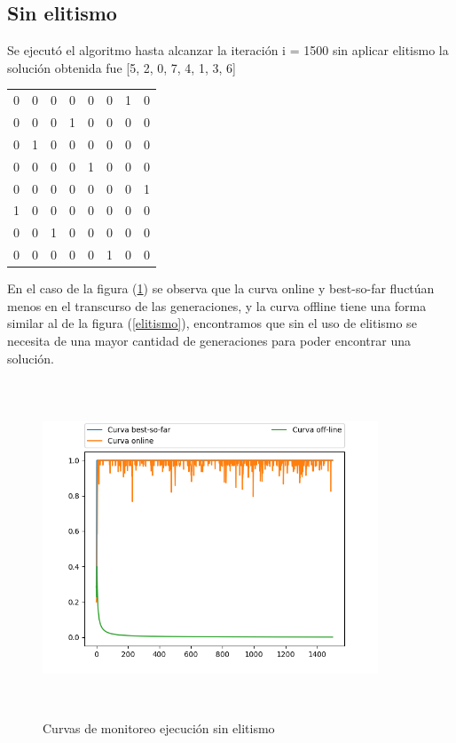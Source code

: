 \documentclass[11pt]{article}
\begin{document}
\subsection{Sin elitismo}
Se ejecut\'o el algoritmo hasta alcanzar la iteraci\'on i = 1500 sin aplicar elitismo la soluci\'on obtenida fue [5, 2, 0, 7, 4, 1, 3, 6]

\begin{center}
\begin{tabular}{ c c c c c c c c }
	0 & 0 & 0 & 0 & 0 & 0 & 1 & 0\\
	0 & 0 & 0 & 1 & 0 & 0 & 0 & 0\\
	0 & 1 & 0 & 0 & 0 & 0 & 0 & 0\\
	0 & 0 & 0 & 0 & 1 & 0 & 0 & 0\\
	0 & 0 & 0 & 0 & 0 & 0 & 0 & 1\\
	1 & 0 & 0 & 0 & 0 & 0 & 0 & 0\\
	0 & 0 & 1 & 0 & 0 & 0 & 0 & 0\\
	0 & 0 & 0 & 0 & 0 & 1 & 0 & 0
\end{tabular}
\end{center}
En el caso de la figura (\ref{sinelitismo}) se observa que la curva online y best-so-far fluct\'uan menos en el transcurso de las generaciones, y la curva offline tiene una forma similar al de la figura (\ref{elitismo}), encontramos que sin el uso de elitismo se necesita de una mayor cantidad de generaciones para poder encontrar una soluci\'on.
\begin{figure}[h]
    \includegraphics[width=10cm, height=10cm]{Figure_2}
    \centering
    \caption{Curvas de monitoreo ejecuci\'on sin elitismo}
    \label{sinelitismo}
    \end{figure}
\end{document}
